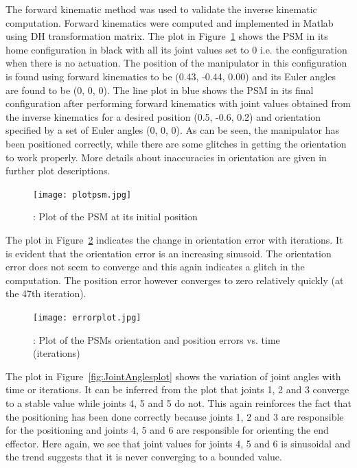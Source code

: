 \documentclass[10pt,journal,compsoc]{IEEEtran}
\begin{document}
The forward kinematic method was used to validate the inverse kinematic computation. Forward kinematics were computed and implemented in Matlab using DH transformation matrix.
The plot in Figure~\ref{fig:plotpsm} shows the PSM in its home configuration in black with all its joint values set to 0 i.e. the configuration when there is no actuation. The position of the manipulator in this configuration is found using forward kinematics to be (0.43, -0.44, 0.00) and its Euler angles are found to be (0, 0, 0). The line plot in blue shows the PSM in its final configuration after performing forward kinematics with joint values obtained from the inverse kinematics for a desired position (0.5, -0.6, 0.2) and orientation specified by a set of Euler angles (0, 0, 0). As can be seen, the manipulator has been positioned correctly, while there are some glitches in getting the orientation to work properly. More details about inaccuracies in orientation are given in further plot descriptions.

\begin{figure}[htbp]
\begin{center}
\texttt{[image: plotpsm.jpg]}
\caption{: Plot of the PSM at its initial position}
\label{fig:plotpsm}
\end{center}
\end{figure}

The plot in Figure~\ref{fig:errorplot} indicates the change in orientation error with iterations. It is evident that the orientation error is an increasing sinusoid. The orientation error does not seem to converge and this again indicates a glitch in the computation. The position error however converges to zero relatively quickly (at the 47th iteration).

\begin{figure}[htbp]
\begin{center}
\texttt{[image: errorplot.jpg]}
\caption{: Plot of the PSM\textquotesingle s orientation and position errors vs. time (iterations)}
\label{fig:errorplot}
\end{center}
\end{figure}

The plot in Figure~\ref{fig:JointAnglesplot} shows the variation of joint angles with time or iterations. It can be inferred from the plot that joints 1, 2 and 3 converge to a stable value while joints 4, 5 and 5 do not. This again reinforces the fact that the positioning has been done correctly because joints 1, 2 and 3 are responsible for the positioning and joints 4, 5 and 6 are responsible for orienting the end effector. Here again, we see that joint values for joints 4, 5 and 6 is sinusoidal and the trend suggests that it is never converging to a bounded value.
\end{document}
